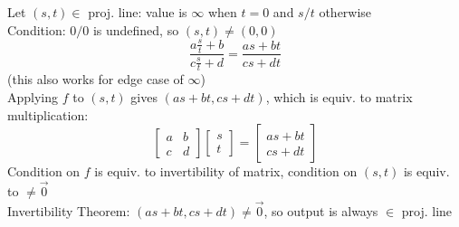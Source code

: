 \documentclass{article}
\begin{document}
Let $(s, t) \in$ proj. line:
value is $\infty$ when $t=0$ and $s/t$ otherwise \\
Condition: $0/0$ is undefined, so $(s, t) \neq (0, 0)$\\
\[\frac{a\frac{s}{t}+b}{c\frac{s}{t}+d}=\frac{as+bt}{cs+dt}\]
(this also works for edge case of $\infty$)\\
Applying $f$ to $(s, t)$ gives $(as+bt, cs+dt)$, which is equiv. to matrix multiplication:
\[\begin{bmatrix} a & b \\ c & d \end{bmatrix}
\begin{bmatrix} s \\ t \end{bmatrix} =
\begin{bmatrix} as+bt \\ cs+dt \end{bmatrix}\]
Condition on $f$ is equiv. to invertibility of matrix,
condition on $(s, t)$ is equiv. to $\neq\vec{0}$\\
Invertibility Theorem: $(as+bt, cs+dt)\neq\vec{0}$,
so output is always $\in$ proj. line

\end{document}
